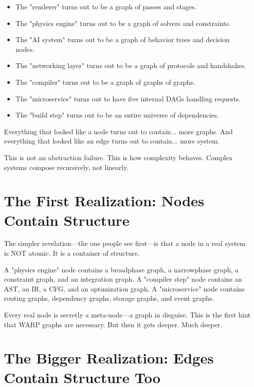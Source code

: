 \begin{itemize}
    \item The "renderer" turns out to be a graph of passes and stages.
    \item The "physics engine" turns out to be a graph of solvers and constraints.
    \item The "AI system" turns out to be a graph of behavior trees and decision nodes.
    \item The "networking layer" turns out to be a graph of protocols and handshakes.
    \item The "compiler" turns out to be a graph of graphs of graphs.
    \item The "microservice" turns out to have five internal DAGs handling requests.
    \item The "build step" turns out to be an entire universe of dependencies.
\end{itemize}

Everything that looked like a node turns out to contain... more graphs. And everything that looked like an edge turns out to contain... more system.

This is not an abstraction failure. This is how complexity behaves. Complex systems compose recursively, not linearly.

\section{The First Realization: Nodes Contain Structure}
\label{sec:nodes-contain-structure}

The simpler revelation—the one people see first—is that a node in a real system is NOT atomic. It is a container of structure.

A "physics engine" node contains a broadphase graph, a narrowphase graph, a constraint graph, and an integration graph. A "compiler step" node contains an AST, an IR, a CFG, and an optimization graph. A "microservice" node contains routing graphs, dependency graphs, storage graphs, and event graphs.

Every real node is secretly a meta-node—a graph in disguise. This is the first hint that WARP graphs are necessary. But then it gets deeper. Much deeper.

\section{The Bigger Realization: Edges Contain Structure Too}
\label{sec:edges-contain-structure}

